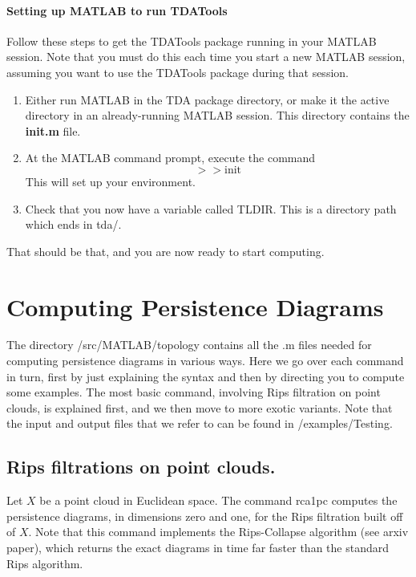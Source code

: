 \documentclass[a4paper,10pt]{article}
\begin{document}
\paragraph{Setting up MATLAB to run TDATools}

Follow these steps to get the TDATools package running in your MATLAB session.
Note that you must do this each time you start a new MATLAB session, assuming you want
to use the TDATools package during that session.

\begin{enumerate}
   \item Either run MATLAB in the TDA package directory, or make it the active directory in an already-running MATLAB session.  This directory contains the \textbf{init.m} file.
   \item At the MATLAB command prompt, execute the command $$>> \mbox{init}$$  This will set up your environment.\\
   \item Check that you now have a variable called TLDIR. This is a directory path which ends in tda/.
\end{enumerate}

That should be that, and you are now ready to start computing.





\section{Computing Persistence Diagrams}

The directory /src/MATLAB/topology contains all the .m files needed for computing persistence diagrams in various
ways. Here we go over each command in turn, first by just explaining the syntax and then by directing you to compute
some examples. The most basic command, involving Rips filtration on point clouds, is explained first, and
we then move to more exotic variants.
Note that the input and output files that we refer to can be found in /examples/Testing.

\subsection{Rips filtrations on point clouds.}

Let $X$ be a point cloud in Euclidean space.
The command rca1pc computes the persistence diagrams, in dimensions zero and one, for the Rips filtration built off of $X$.
Note that this command implements the Rips-Collapse algorithm (see arxiv paper), which returns the exact diagrams in time far
faster than the standard Rips algorithm.
\end{document}
